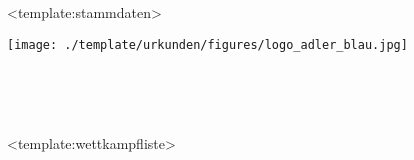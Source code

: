 \documentclass[a4paper,12pt]{article}
\begin{document}

\pagestyle{empty}

{<template:stammdaten>}{


\begin{minipage}[l]{3cm}%
	\texttt{[image: ./template/urkunden/figures/logo\_adler\_blau.jpg]}
\end{minipage}%
\hfill
\begin{minipage}[r]{15cm}%
	\centering
	\fontsize{60}{40} 
\end{minipage}


\vspace{1cm}


\begin{center}
	\fontsize{40}{36} \selectfont{1. Neujahrs-Pokal}\\
	\vspace{1cm}
	\fontsize{30}{24} \selectfont{DLRG Ortsgruppe G\"ottingen}
\end{center}


\vspace{1cm}


\begin{center}
	\fontsize{30}{24} \selectfont{{\dvorname} {\dnachname}}\\
	\vspace{1cm}
	\fontsize{30}{24} 
\end{center}


\vspace{1cm}


\begin{center}
<template:wettkampfliste>
\end{center}


}
\end{document}
